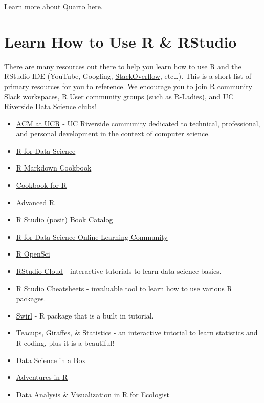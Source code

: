 \documentclass[
]{book}
\providecommand{\tightlist}{%
  \setlength{\itemsep}{0pt}\setlength{\parskip}{0pt}}
\begin{document}
Learn more about Quarto \href{https://quarto.org/docs/get-started/hello/rstudio.html}{here}.

\hypertarget{learn-how-to-use-r-rstudio}{%
\section{Learn How to Use R \& RStudio}\label{learn-how-to-use-r-rstudio}}

There are many resources out there to help you learn how to use R and the RStudio IDE (YouTube, Googling, \href{https://stackoverflow.com/}{StackOverflow}, etc\ldots). This is a short list of primary resources for you to reference. We encourage you to join R community Slack workspaces, R User community groups (such as \href{https://rladies.org/}{R-Ladies}), and UC Riverside Data Science clubs!

\begin{itemize}
\tightlist
\item
  \href{https://acmucr.org/index.html}{ACM at UCR} - UC Riverside community dedicated to technical, professional, and personal development in the context of computer science.
\item
  \href{https://r4ds.had.co.nz/}{R for Data Science}
\item
  \href{https://bookdown.org/yihui/rmarkdown-cookbook/}{R Markdown Cookbook}
\item
  \href{http://www.cookbook-r.com/}{Cookbook for R}
\item
  \href{https://adv-r.hadley.nz/}{Advanced R}
\item
  \href{https://www.rstudio.com/resources/books/}{R Studio (posit) Book Catalog}
\item
  \href{https://www.rfordatasci.com/}{R for Data Science Online Learning Community}
\item
  \href{https://ropensci.org/}{R OpenSci}
\item
  \href{https://rstudio.cloud/learn/primers}{RStudio Cloud} - interactive tutorials to learn data science basics.
\item
  \href{https://www.rstudio.com/resources/cheatsheets/}{R Studio Cheatsheets} - invaluable tool to learn how to use various R packages.
\item
  \href{https://swirlstats.com/}{Swirl} - R package that is a built in tutorial.
\item
  \href{https://tinystats.github.io/teacups-giraffes-and-statistics/index.html}{Teacups, Giraffes, \& Statistics} - an interactive tutorial to learn statistics and R coding, plus it is a beautiful!
\item
  \href{https://datasciencebox.org/}{Data Science in a Box}
\item
  \href{https://www.adventures-in-r.com/}{Adventures in R}
\item
  \href{https://datacarpentry.org/R-ecology-lesson/}{Data Analysis \& Visualization in R for Ecologist}
\end{itemize}
\end{document}
